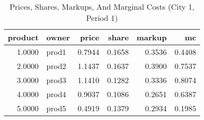 \begin{table}[H]
    \centering
    \caption{Prices, Shares, Markups, And Marginal Costs (City 1, Period 1)}
    \label{tab:q10_results_city1_period1_single_market}
\begin{tabular}{rlrrrr}
\toprule
product & owner & price & share & markup & mc \\
\midrule
\midrule
1.0000 & prod1 & 0.7944 & 0.1658 & 0.3536 & 0.4408 \\
2.0000 & prod2 & 1.1437 & 0.1637 & 0.3900 & 0.7537 \\
3.0000 & prod3 & 1.1410 & 0.1282 & 0.3336 & 0.8074 \\
4.0000 & prod4 & 0.9037 & 0.1086 & 0.2651 & 0.6387 \\
5.0000 & prod5 & 0.4919 & 0.1379 & 0.2934 & 0.1985 \\
\bottomrule
\bottomrule
\end{tabular}

\end{table}
